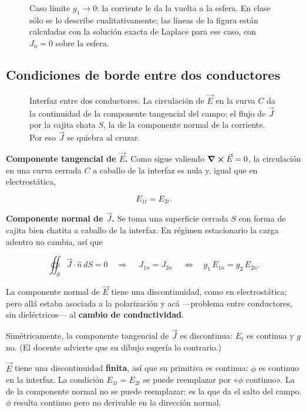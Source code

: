 \documentclass[12pt,a4paper]{article}
\begin{document}
\begin{figure}[H]
  \centering
  
  \caption{Caso límite $g_1\to0$: la corriente le da la vuelta a la esfera. En clase sólo se lo describe cualitativamente; las líneas de la figura están calculadas con la solución exacta de Laplace para ese caso, con $J_n = 0$ sobre la esfera.}
\end{figure}

\subsection{Condiciones de borde entre dos conductores}

\begin{figure}[H]
  \centering
  
  \caption{Interfaz entre dos conductores. La circulación de $\vec E$ en la curva $C$ da la continuidad de la componente tangencial del campo; el flujo de $\vec J$ por la cajita chata $S$, la de la componente normal de la corriente. Por eso $\vec J$ se quiebra al cruzar.}
\end{figure}

\textbf{Componente tangencial de $\vec E$.} Como sigue valiendo
$\curl \vec E = 0$, la circulación en una curva cerrada $C$ a caballo de
la interfaz es nula y, igual que en electrostática,

\[
E_{1t} = E_{2t} .
\]

\textbf{Componente normal de $\vec J$.} Se toma una superficie cerrada $S$ con forma
de cajita bien chatita a caballo de la interfaz. En régimen estacionario la
carga adentro no cambia, así que

\[
\oiint_S \vec J\cdot\hat n\,dS = 0
\quad\Longrightarrow\quad
\boxed{\ J_{1n} = J_{2n}\ }
\quad\Longleftrightarrow\quad
g_1\,E_{1n} = g_2\,E_{2n} .
\]

La componente normal de $\vec E$ tiene una discontinuidad, como en
electrostática; pero allá estaba asociada a la polarización y acá ---problema
entre conductores, sin dieléctricos--- al \textbf{cambio de conductividad}.

Simétricamente, la componente tangencial de $\vec J$ es discontinua: $E_t$ es
continua y $g$ no. (El docente advierte que su dibujo sugería lo contrario.)

\begin{notebox}
$\vec E$ tiene una discontinuidad \textbf{finita}, así que
su primitiva es continua: $\phi$ es continuo en la interfaz. La condición
$E_{1t}=E_{2t}$ se puede reemplazar por «$\phi$ continuo». La de la componente
normal no se puede reemplazar: es la que da el salto del campo. $\phi$ resulta
continuo pero no derivable en la dirección normal.
\end{notebox}
\end{document}
